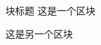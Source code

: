 \begin{frame}
\begin{block}{块标题}
这是一个区块
\end{block}

\begin{block}{}%
这是另一个区块
\end{block}
\end{frame}
